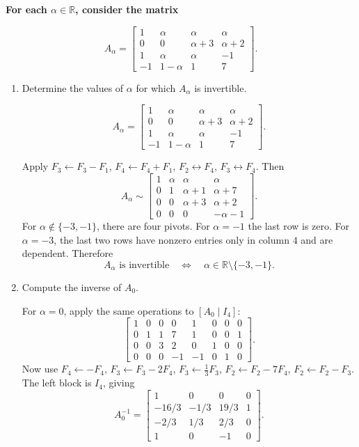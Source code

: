 \providecommand{\rank}{\operatorname{r}}
\providecommand{\RR}{\mathbb R}
\providecommand{\CC}{\mathbb C}
\providecommand{\KK}{\mathbb K}

\setcounter{enumi}{26}
\item {\bfseries\boldmath
For each $\alpha\in\RR$, consider the matrix
}

\[
A_\alpha=\begin{bmatrix}1&\alpha&\alpha&\alpha\\0&0&\alpha+3&\alpha+2\\1&\alpha&\alpha&-1\\-1&1-\alpha&1&7\end{bmatrix}.
\]

\begin{enumerate}[label=\alph*)]

\item Determine the values of $\alpha$ for which $A_\alpha$ is invertible.

\begin{answer}
\[
 A_\alpha=\begin{bmatrix}
1&\alpha&\alpha&\alpha\\0&0&\alpha+3&\alpha+2\\
1&\alpha&\alpha&-1\\-1&1-\alpha&1&7
\end{bmatrix}.
\]

Apply $F_3\gets F_3-F_1$, $F_4\gets F_4+F_1$,
$F_2\leftrightarrow F_4$, $F_3\leftrightarrow F_4$. Then
\[
 A_\alpha\sim
 \begin{bmatrix}
 1&\alpha&\alpha&\alpha\\0&1&\alpha+1&\alpha+7\\
 0&0&\alpha+3&\alpha+2\\0&0&0&-\alpha-1
 \end{bmatrix}.
\]
For $\alpha\notin\{-3,-1\}$, there are four pivots. For $\alpha=-1$ the last
row is zero. For $\alpha=-3$, the last two rows have nonzero entries only in
column $4$ and are dependent. Therefore
\[
 A_\alpha\text{ is invertible}\quad\Longleftrightarrow\quad
 \alpha\in\RR\setminus\{-3,-1\}.
\]
\end{answer}

\item Compute the inverse of $A_0$.

\begin{answer}
For $\alpha=0$, apply the same operations to $[A_0\mid I_4]$:
\[
\left[\begin{array}{rrrr|rrrr}
1&0&0&0&1&0&0&0\\0&1&1&7&1&0&0&1\\
0&0&3&2&0&1&0&0\\0&0&0&-1&-1&0&1&0
\end{array}\right].
\]
Now use $F_4\gets-F_4$, $F_3\gets F_3-2F_4$,
$F_3\gets\frac13F_3$, $F_2\gets F_2-7F_4$,
$F_2\gets F_2-F_3$. The left block is $I_4$, giving
\[
 A_0^{-1}=\begin{bmatrix}
 1&0&0&0\\-16/3&-1/3&19/3&1\\-2/3&1/3&2/3&0\\1&0&-1&0
 \end{bmatrix}.
\]
\end{answer}
\end{enumerate}
